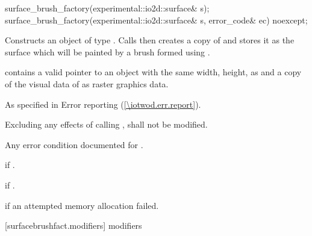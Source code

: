 \begin{itemdecl}
    surface_brush_factory(experimental::io2d::surface& s);
    surface_brush_factory(experimental::io2d::surface& s, error_code& ec) noexcept;
\end{itemdecl}
\begin{itemdescr}
	\pnum
	\effects
	Constructs an object of type . Calls  then creates a copy of  and stores it as the surface which will be painted by a brush formed using .
	
	\pnum
	\postconditions
	 contains a valid pointer to an  object with the same width, height,  as  and a copy of the visual data of  as raster graphics data.
	
	\pnum
	\throws
	As specified in Error reporting (\ref{\iotwod.err.report}).
	
	\pnum
	\remarks
	Excluding any effects of calling ,  shall not be modified.
	
	\pnum
	\errors
	Any error condition documented for .
	
	\pnum
	 if .
	
	\pnum
	 if .
	
	\pnum
	 if an attempted memory allocation failed.
	
\end{itemdescr}

 [surfacebrushfact.modifiers]{ modifiers}

